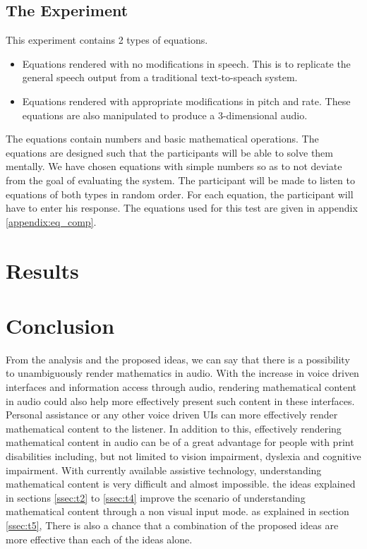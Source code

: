 \documentclass{article}
\begin{document}
\subsection{The Experiment}
\label{ssec:comp_exp}

This experiment contains 2 types of equations.
\begin{itemize}
\item Equations rendered with no modifications in speech. This is to replicate the general speech output from a traditional text-to-speach system.
\item Equations rendered with appropriate modifications in pitch and rate. These equations are also manipulated to produce a 3-dimensional audio.
\end{itemize}
The equations contain numbers and basic mathematical operations. The equations are designed such that the participants will be able to solve them mentally. We have chosen equations with simple numbers so as to not deviate from the goal of evaluating the system. 
The participant will be made to listen to equations of both  types in random order. For each equation, the participant will have to enter his response. The equations used for this test are given in appendix \ref{appendix:eq_comp}.

\section{Results}
\label{results}


\section{Conclusion }
\label{sec:conclusion}

From the analysis and the proposed ideas, we can say that there is a possibility to unambiguously render mathematics in audio. With the increase in voice driven interfaces and information access through audio, rendering mathematical content in audio could also help more effectively present such content in these interfaces. Personal assistance or any other voice driven UIs can more effectively render mathematical content to the listener. In addition to this, effectively rendering mathematical content in audio can be of a great advantage for people with print disabilities including, but not limited to vision  impairment, dyslexia and cognitive impairment. With currently available assistive technology, understanding mathematical content is very difficult and almost impossible. the ideas explained in sections \ref{ssec:t2} to \ref{ssec:t4} improve the scenario  of understanding mathematical content through a non visual input mode. as explained in section \ref{ssec:t5}, There is also a chance that a combination of the proposed ideas are more effective than each of the ideas alone.
\end{document}
